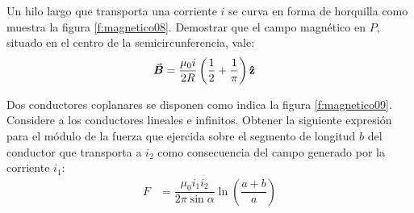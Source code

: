 %
\begin{Exercise}\label{p:magnetico08}
    Un hilo largo que transporta una corriente $i$ se curva en forma de horquilla como muestra la figura \ref{f:magnetico08}. Demostrar que el campo magnético en $P$, situado en el centro de la semicircunferencia, vale:
    \begin{align*}
        \va*{B} &= \dfrac{\mu_0 i}{2R} \left ( \dfrac{1}{2} + \dfrac{1}{\pi} \right ) \vu{z}
    \end{align*}
\end{Exercise}
%
\begin{center}
\end{center}
%
\begin{Exercise}\label{p:magnetico09}
    Dos conductores coplanares se disponen como indica la figura \ref{f:magnetico09}. Considere a los conductores lineales e infinitos. Obtener la siguiente expresión para el módulo de la fuerza que ejercida sobre el segmento de longitud $b$ del conductor que transporta a $i_2$ como consecuencia del campo generado por la corriente $i_1$:
    \begin{align*}
        F &= \dfrac{\mu_0 i_1 i_2}{2\pi \sin\alpha} \ln \left ( \dfrac{a+b}{a}\right )
    \end{align*}
\end{Exercise}
%
